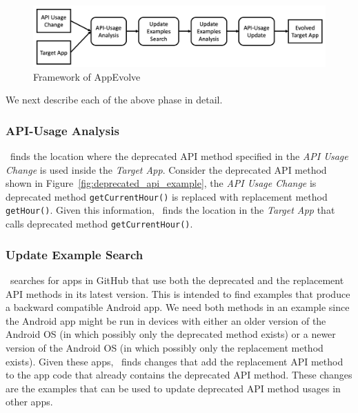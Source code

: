 \begin{figure}[t]
	\centering
	\includegraphics[width=0.8\linewidth]{framework.png}
	\caption{Framework of AppEvolve}
	\label{fig:framework}
\end{figure}

We next describe each of the above phase in detail.
\subsubsection{API-Usage Analysis}
\toolname\ finds the location where the deprecated API method specified in the {\em API Usage Change} is used inside the {\em Target App}. Consider the deprecated API method shown in Figure~\ref{fig:deprecated_api_example}, the {\em API Usage Change} is deprecated method \texttt{getCurrentHour()} is replaced with replacement method \texttt{getHour()}. Given this information, \toolname\ finds the location in the {\em Target App} that calls deprecated method \texttt{getCurrentHour()}. %

\subsubsection{Update Example Search}
\toolname\ searches for apps in GitHub that use both the deprecated and the replacement API methods in its latest version. This is intended to find examples that produce a backward compatible Android app. We need both methods in an example since the Android app might be run in devices with either an older version of the Android OS (in which possibly only the deprecated method exists) or a newer version of the Android OS (in which possibly only the replacement method exists). Given these apps, \toolname\ finds changes that add the replacement API method to the app code that already contains the deprecated API method. These changes are the examples that can be used to update deprecated API method usages in other apps.

